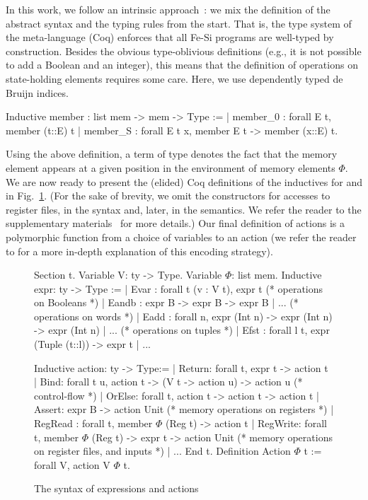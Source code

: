\documentclass{llncs}
\begin{document}
In this work, we follow an intrinsic
approach~\cite{DBLP:journals/jar/BentonHKM12}: we mix the definition
of the abstract syntax and the typing rules from the start. That is,
the type system of the meta-language (Coq) enforces that all Fe-Si
programs are well-typed by construction.
%
Besides the obvious type-oblivious definitions (e.g., it is not
possible to add a Boolean and an integer), this means that the
definition of operations on state-holding elements requires some care.
%
Here, we use dependently typed de Bruijn indices. 
\begin{mcoq}
Inductive member : list mem -> mem ->  Type :=
| member_0 : forall E t, member (t::E) t
| member_S : forall E t x, member E t -> member (x::E) t.
\end{mcoq}
Using the above definition, a term of type  denotes
the fact that the memory element  appears at a given position
in the environment of memory elements $\Phi$. 
%
We are now ready to present the (elided) Coq definitions of the
inductives for  and  in Fig.~\ref{fig:fesi}.
%
(For the sake of brevity, we omit the constructors for accesses to
register files, in the syntax and, later, in the semantics. We refer
the reader to the supplementary materials~\cite{fesi} for more details.)
%
Our final definition  of actions is a polymorphic
function from a choice of variables to an action (we refer the reader
to \cite{phoas-chlipala} for a more in-depth explanation of this
encoding strategy).

\begin{figure}
  \centering
\begin{coq}
Section t. 
Variable V: ty -> Type. Variable $\Phi$: list mem. 
Inductive expr: ty -> Type :=
| Evar : forall t (v : V t), expr t
(* operations on Booleans *)
| Eandb : expr B -> expr B -> expr B | ... 
(* operations on words *)
| Eadd : forall n, expr (Int n) -> expr (Int n) -> expr (Int n) | ... 
(* operations on tuples *)
| Efst : forall l t, expr (Tuple (t::l)) -> expr t | ...

Inductive action: ty -> Type:=
| Return: forall t, expr t -> action t
| Bind: forall t u,  action  t -> (V t -> action u) -> action u
(* control-flow *)
| OrElse: forall t, action t -> action t -> action t
| Assert: expr B -> action Unit    
(* memory operations on registers *)
| RegRead : forall t, member $\Phi$ (Reg t) -> action t
| RegWrite: forall t, member $\Phi$ (Reg t) -> expr t -> action Unit
(* memory operations on register files, and inputs *)
| ... 
End t. 
Definition Action $\Phi$ t := forall V, action V $\Phi$ t.  
\end{coq}
  \caption{The syntax of expressions and actions}
  \label{fig:fesi}
\end{figure}
\end{document}
